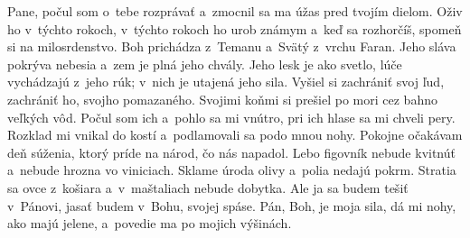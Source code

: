 Pane, počul som o~tebe rozprávať
a~zmocnil sa ma úžas pred tvojím dielom.
\versseparator
Oživ ho v~týchto rokoch,
v~týchto rokoch ho urob známym
a~keď sa rozhorčíš, spomeň si na milosrdenstvo.
\versseparator
Boh prichádza z~Temanu
a~Svätý z~vrchu Faran.
\versseparator
Jeho sláva pokrýva nebesia
a~zem je plná jeho chvály.
\versseparator
Jeho lesk je ako svetlo,
lúče vychádzajú z~jeho rúk;
v~nich je utajená jeho sila.
\versseparator
Vyšiel si zachrániť svoj ľud,
zachrániť ho, svojho pomazaného.
\versseparator
Svojimi koňmi si prešiel po mori
cez bahno veľkých vôd.
\versseparator
Počul som ich a~pohlo sa mi vnútro,
pri ich hlase sa mi chveli pery.
\versseparator
Rozklad mi vnikal do kostí
a~podlamovali sa podo mnou nohy.
\versseparator
Pokojne očakávam deň súženia,
ktorý príde na národ, čo nás napadol.
\versseparator
Lebo figovník nebude kvitnúť
a~nebude hrozna vo viniciach.
\versseparator
Sklame úroda olivy
a~polia nedajú pokrm.
\versseparator
Stratia sa ovce z~košiara
a~v~maštaliach nebude dobytka.
\versseparator
Ale ja sa budem tešiť v~Pánovi,
jasať budem v~Bohu, svojej spáse.
\versseparator
Pán, Boh, je moja sila,
dá mi nohy, ako majú jelene,
a~povedie ma po mojich výšinách.